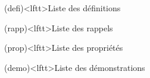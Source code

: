 \documentclass[../../main/main.tex]{subfiles}
\begin{document}


\vspace*{\fill}
\minitoc
\vspace*{\fill}

\newpage

\vspace*{\fill}
\begin{boxes}
	\footnotesize
	\begin{tcb}(defi)<lftt>{Liste des définitions}
	\end{tcb}
	\begin{tcb}(rapp)<lftt>{Liste des rappels}
	\end{tcb}
	\begin{tcb}(prop)<lftt>{Liste des propriétés}
	\end{tcb}
	\begin{tcb}(demo)<lftt>{Liste des démonstrations}

\end{tcb}
\end{boxes}
\end{document}
